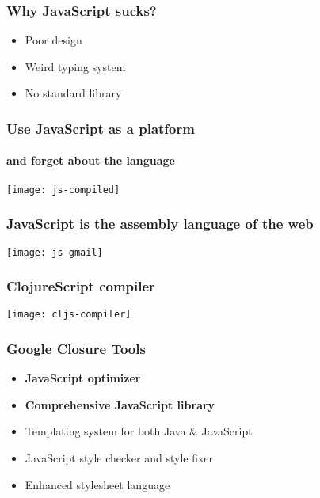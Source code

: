 \begin{frame}
  \frametitle{Why JavaScript sucks?}
  \begin{itemize}
  \item Poor design
  \item Weird typing system
  \item No standard library
  \end{itemize}
\end{frame}

\begin{frame}
  \frametitle{Use JavaScript as a platform}
  \framesubtitle{and forget about the language}

  \begin{center}
      {\texttt{[image: js-compiled]}}
  \end{center}
\end{frame}


\begin{frame}
  \frametitle{JavaScript is the assembly language of the web}

  \begin{center}
      {\texttt{[image: js-gmail]}}
  \end{center}

\end{frame}


\begin{frame}
  \frametitle{ClojureScript compiler}

  \begin{center}
      {\texttt{[image: cljs-compiler]}}
  \end{center}

\end{frame}


\begin{frame}
  \frametitle{Google Closure Tools}


  \begin{itemize}[<+->]
  \item <1-> \textbf{JavaScript optimizer}
  \item <1-> \textbf{Comprehensive JavaScript library}
  \item <2-> Templating system for both Java \& JavaScript
  \item <2-> JavaScript style checker and style fixer
  \item <2-> Enhanced stylesheet language
  \end{itemize}

\end{frame}


